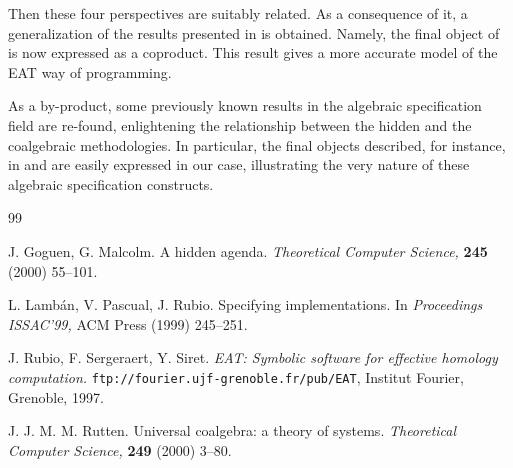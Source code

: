 \documentclass[11pt]{article}   %
\begin{document}
Then these four perspectives are suitably related. As a
consequence of it, a generalization of the results presented in
\cite{ISSAC99} is obtained. Namely, the final object of
\cite{ISSAC99} is now expressed as a coproduct. This result gives
a more accurate model of the EAT way of programming.

As a by-product, some previously known results in the algebraic
specification field are re-found, enlightening the relationship
between the hidden and the coalgebraic methodologies. In
particular, the final objects described, for instance, in
\cite{Hidden} and \cite{Coalg} are easily expressed in our case,
illustrating the very nature of these algebraic specification
constructs.

\begin{thebibliography}{99}

   J. Goguen, G. Malcolm.
   A hidden agenda.
   {\it Theoretical Computer Science,}
   {\bf 245} (2000) 55--101.

   L. Lamb\'an, V. Pascual, J. Rubio.
   Specifying implementations.
   In {\it Proceedings ISSAC'99,}
   ACM Press (1999) 245--251.

   J. Rubio, F. Sergeraert, Y. Siret.
   {\it EAT: Symbolic software for effective homology
   computation.}
   {\tt ftp://fourier.ujf-grenoble.fr/pub/EAT},
   Institut Fourier, Grenoble, 1997.

   J. J. M. M. Rutten.
   Universal coalgebra: a theory of systems.
   {\it Theoretical Computer Science,}
   {\bf 249} (2000) 3--80.

\end{thebibliography}
\end{document}
